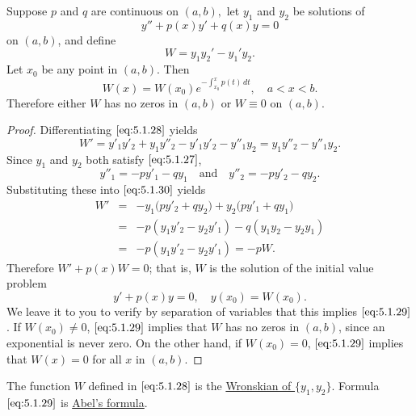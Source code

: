\documentclass{ximera}
\begin{document}
\begin{theorem}\label{thmtype:5.1.4}
Suppose $p$ and $q$ are continuous on $(a,b),$ let $y_1$ and
$y_2$ be solutions of
\begin{equation}\label{eq:5.1.27}
y''+p(x)y'+q(x)y=0
\end{equation}
on $(a,b)$, and define
\begin{equation}\label{eq:5.1.28}
W=y_1y_2'-y_1'y_2.
\end{equation}
Let  $x_0$ be any point in $(a,b).$ Then
\begin{equation} \label{eq:5.1.29}
W(x)=W(x_0) e^{-\int^x_{x_0}p(t)\,
dt}, \quad a<x<b.
\end{equation}
Therefore  either $W$ has no zeros in  $(a,b)$ or $W\equiv0$
on  $(a,b).$
\end{theorem}
 
 
 
\begin{proof}
Differentiating $\eqref{eq:5.1.28}$ yields
\begin{equation}\label{eq:5.1.30}
W'=y'_1y'_2+y_1y''_2-y'_1y'_2-y''_1y_2=
y_1y''_2-y''_1y_2.
\end{equation}
 Since $y_1$ and $y_2$ both satisfy $\eqref{eq:5.1.27}$,
$$
y''_1 =-py'_1-qy_1\quad\mbox{and}\quad
y''_2 =-py'_2-qy_2.
$$
Substituting these into $\eqref{eq:5.1.30}$ yields
\begin{eqnarray*}
W'&=& -y_1\bigl(py'_2+qy_2\bigr)
+y_2\bigl(py'_1+qy_1\bigr) \\
&=&  -p(y_1y'_2-y_2y'_1)-q(y_1y_2-y_2y_1)\\
&=& -p(y_1y'_2-y_2y'_1)=-pW.
\end{eqnarray*}
Therefore $W'+p(x)W=0$;
that is, $W$ is the solution of the initial value problem
$$
y'+p(x)y=0,\quad y(x_0)=W(x_0).
$$
We leave it to you to verify by separation of variables that this
implies $\eqref{eq:5.1.29}$. If $W(x_0)\ne0$, $\eqref{eq:5.1.29}$ implies
that
$W$ has no zeros in $(a,b)$, since an exponential is never zero. On
the other hand, if $W(x_0)=0$,  $\eqref{eq:5.1.29}$ implies that $W(x)=0$
for all $x$ in $(a,b)$.
\end{proof}
 
The function $W$ defined in $\eqref{eq:5.1.28}$ is  the
\href{https://en.wikipedia.org/wiki/Wronskian}{Wronskian of $\{y_1,y_2\}$}.
Formula $\eqref{eq:5.1.29}$ is
\href{https://en.wikipedia.org/wiki/Abel%27s_identity}
{Abel's formula}.
 
\end{document}
